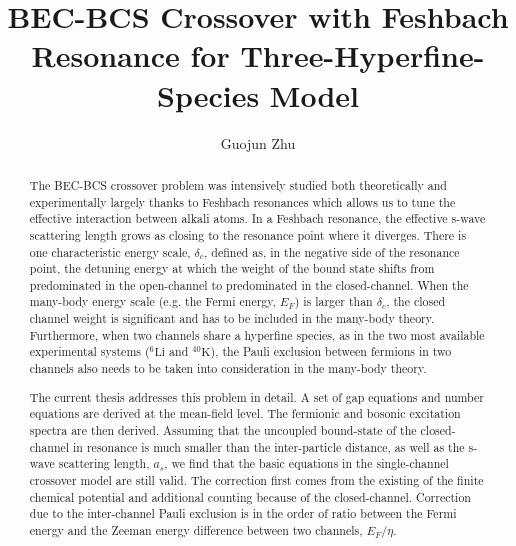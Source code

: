 \documentclass[edeposit,fullpage,prequest,10pt]{uiucthesis2009}
\begin{document}
\title{BEC-BCS Crossover with Feshbach Resonance for Three-Hyperfine-Species Model}
\author{Guojun Zhu}
\phdthesis
{}
\maketitle

\frontmatter

%
\begin{abstract}
The BEC-BCS crossover problem was intensively studied both theoretically and experimentally largely thanks to  Feshbach resonances which allows us to tune the effective interaction between alkali atoms.  In a Feshbach resonance, the effective s-wave scattering length grows as closing to the resonance point where it diverges.  There is one characteristic energy scale, $\delta_c$, defined as, in the negative side of the resonance point, the detuning energy at which the weight of the bound state shifts from predominated in the open-channel to predominated in the closed-channel.  When the many-body energy scale (e.g. the Fermi energy, $E_{F}$) is larger than $\delta_c$, the closed channel weight is significant and has to be included in the many-body theory.  Furthermore, when two channels share a hyperfine species, as in the two most available experimental systems (${}^6\text{Li}$ and ${}^{40}\text{K}$), the Pauli exclusion between fermions in two channels also needs to be taken into consideration in the many-body theory.  

The current  thesis addresses this problem in detail. A set of gap equations and number equations  are derived at the mean-field level.  The fermionic and bosonic excitation spectra are then derived. Assuming that the uncoupled bound-state of the closed-channel in resonance is much smaller than the inter-particle distance, as well as the s-wave scattering length, $a_s$, we find that  the basic equations in the single-channel crossover model are still valid. The correction first comes from the existing of the finite chemical potential and additional counting because of the closed-channel.  Correction due to the inter-channel Pauli exclusion is   in the  order of ratio between the Fermi energy and the Zeeman energy difference between two channels, $E_F/\eta$.  
\end{abstract}
\end{document}
